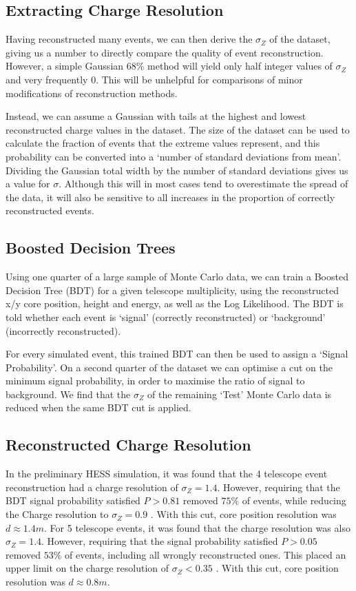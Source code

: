 \documentclass{article}
\begin{document}
\subsection{Extracting Charge Resolution}
Having reconstructed many events, we can then derive the $\sigma_{Z}$ of the dataset, giving us a number to directly compare the quality of event reconstruction. However, a simple Gaussian 68\% method will yield only half integer values of $\sigma_{Z}$ and very frequently 0. This will be unhelpful for comparisons of minor modifications of reconstruction methods.

Instead, we can assume a Gaussian with tails at the highest and lowest reconstructed charge values in the dataset. The size of the dataset can be used to calculate the fraction of events that the extreme values represent, and this probability can be converted into a \textquoteleft number of standard deviations from mean'. Dividing the Gaussian total width by the number of standard deviations gives us a value for $\sigma$. Although this will in most cases tend to overestimate the spread of the data, it will also be sensitive to all increases in the proportion of correctly reconstructed events.

\subsection{Boosted Decision Trees}
Using one quarter of a large sample of Monte Carlo data, we can train a Boosted Decision Tree (BDT) for a given telescope multiplicity, using the reconstructed x/y core position, height and energy, as well as the Log Likelihood. The BDT is told whether each event is \textquoteleft signal' (correctly reconstructed) or \textquoteleft background' (incorrectly reconstructed). 

For every simulated event, this trained BDT can then be used to assign a \textquoteleft Signal Probability'. On a second quarter of the dataset we can optimise a cut on the minimum signal probability, in order to maximise the ratio of signal to background. We find that the $\sigma_{Z}$ of the remaining \textquoteleft Test' Monte Carlo data is reduced when the same BDT cut is applied.

\subsection{Reconstructed Charge Resolution}
In the preliminary HESS simulation, it was found that the 4 telescope event reconstruction had a charge resolution of $\sigma_{Z} = 1.4$. However, requiring that the BDT signal probability satisfied $P > 0.81$ removed $75 \%$ of events, while reducing the Charge resolution to $\sigma_{Z} = 0.9$ . With this cut, core position resolution was $d \approx 1.4 m $. For 5 telescope events, it was found that the charge resolution was also $\sigma_{Z} = 1.4$. However, requiring that the signal probability satisfied $P > 0.05$ removed $53 \%$ of events, including all wrongly reconstructed ones. This placed an upper limit on the charge resolution of $\sigma_{Z} < 0.35$ . With this cut, core position resolution was $d \approx 0.8 m $.
\end{document}
